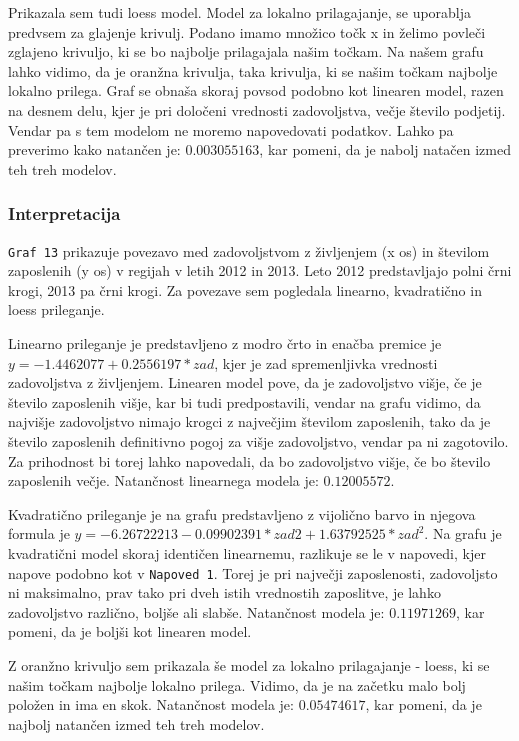 \documentclass[11pt,a4paper]{article}
\begin{document}
Prikazala sem tudi loess model. Model za lokalno prilagajanje, se uporablja predvsem za glajenje krivulj. Podano imamo množico točk x in želimo povleči zglajeno krivuljo, ki se bo najbolje prilagajala našim točkam. Na našem grafu lahko vidimo, da je oranžna krivulja, taka krivulja, ki se našim točkam najbolje lokalno prilega. Graf se obnaša skoraj povsod podobno kot linearen model, razen na desnem delu, kjer je pri določeni vrednosti zadovoljstva, večje število podjetij. Vendar pa s tem modelom ne moremo napovedovati podatkov. Lahko pa preverimo kako natančen je: $0.003055163$, kar pomeni, da je nabolj natačen izmed teh treh modelov.


\subsubsection{Interpretacija}
\par \verb+Graf 13+ prikazuje povezavo med zadovoljstvom z življenjem (x os) in številom zaposlenih (y os) v regijah v letih 2012 in 2013. Leto 2012 predstavljajo polni črni krogi, 2013 pa črni krogi. Za povezave sem pogledala linearno, kvadratično in loess prileganje.
\par Linearno prileganje je predstavljeno z modro črto in enačba premice je $y= -1.4462077 + 0.2556197 *zad$, kjer je zad spremenljivka vrednosti zadovoljstva z življenjem. Linearen model pove, da je zadovoljstvo višje, če je število zaposlenih višje, kar bi tudi predpostavili, vendar na grafu vidimo, da najvišje zadovoljstvo nimajo krogci z največjim številom zaposlenih, tako da je število zaposlenih definitivno pogoj za višje zadovoljstvo, vendar pa ni zagotovilo. Za prihodnost bi torej lahko napovedali, da bo zadovoljstvo višje, če bo število zaposlenih večje. Natančnost linearnega modela je: $0.12005572$.
\par Kvadratično prileganje je na grafu predstavljeno z vijolično barvo in njegova formula je $y= -6.26722213 -0.09902391*zad2 + 1.63792525 *zad^2$. Na grafu je kvadratični model skoraj identičen linearnemu, razlikuje se le v napovedi, kjer napove podobno kot v \verb+Napoved 1+. Torej je pri največji zaposlenosti, zadovoljsto ni maksimalno, prav tako pri dveh istih vrednostih zaposlitve, je lahko zadovoljstvo različno, boljše ali slabše. Natančnost modela je: $0.11971269$, kar pomeni, da je boljši kot linearen model.
\par Z oranžno krivuljo sem prikazala še model za lokalno prilagajanje - loess, ki se našim točkam najbolje lokalno prilega. Vidimo, da je na začetku malo bolj položen in ima en skok. Natančnost modela je: $0.05474617$, kar pomeni, da je najbolj natančen izmed teh treh modelov.

\end{document}
